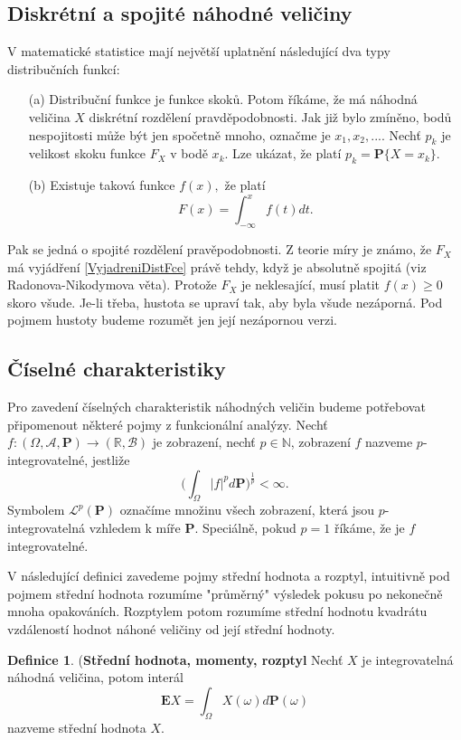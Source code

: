 \documentclass[a4]{report}
\theoremstyle{definition}
\newtheorem{definition}{Definice}[section]
\begin{document}
{\subsection{Diskrétní a spojité náhodné veličiny}
V matematické statistice mají největší uplatnění následující dva typy distribučních funkcí:
\begin{itemize}
\item[(a)] Distribuční funkce je funkce skoků. Potom říkáme, že má náhodná veličina $X$ diskrétní rozdělení pravděpodobnosti. Jak již bylo zmíněno, bodů nespojitosti může být jen spočetně mnoho, označme je $x_{1}, x_{2}, ...$. Nechť $p_{k}$ je velikost skoku funkce $F_{X}$ v bodě $x_{k}$. Lze ukázat, že platí $p_{k} = \textbf{P}\lbrace X = x_{k} \rbrace$.
\item[(b)] Existuje taková funkce $f(x), $ že platí
\begin{equation}\label{VyjadreniDistFce}
F(x) = \int_{-\infty}^{x}f(t)dt.
\end{equation}
\end{itemize}
Pak se jedná o spojité rozdělení pravěpodobnosti. Z teorie míry je známo, že $F_{X}$ má vyjádření \eqref{VyjadreniDistFce} právě tehdy, když je absolutně spojitá (viz Radonova-Nikodymova věta). Protože $F_{X}$ je neklesající, musí platit $f(x) \geq 0$ skoro všude. Je-li třeba, hustota se upraví tak, aby byla všude nezáporná. Pod pojmem hustoty budeme rozumět jen její nezápornou verzi.
\subsection{Číselné charakteristiky}
Pro zavedení číselných charakteristik náhodných veličin budeme potřebovat připomenout některé pojmy z funkcionální analýzy. Nechť $f : (\Omega, \mathcal{A}, \textbf{P}) \longrightarrow (\mathbb{R}, \mathcal{B})$ je zobrazení, nechť $p \in \mathbb{N}$, zobrazení $f$ nazveme $p$-integrovatelné, jestliže
\begin{equation}
\bigg(\int_{\Omega}|f|^{p} d\textbf{P}\bigg)^{\frac{1}{p}} < \infty.
\end{equation}
Symbolem $\mathcal{L}^{p}(\textbf{P})$ označíme množinu všech zobrazení, která jsou $p$-integrovatelná vzhledem k míře $\textbf{P}$. Speciálně, pokud $p = 1$ říkáme, že je $f$ integrovatelné.

V následující definici zavedeme pojmy střední hodnota a rozptyl, intuitivně pod pojmem střední hodnota rozumíme "průměrný" výsledek pokusu po nekonečně mnoha opakováních. Rozptylem potom rozumíme střední hodnotu kvadrátu vzdáleností hodnot náhoné veličiny od její střední hodnoty.
\begin{definition}{(\textbf{Střední hodnota, momenty, rozptyl}}
Nechť $X$ je integrovatelná náhodná veličina, potom interál
\begin{equation}
\textbf{E}X = \int_{\Omega}X(\omega) d\textbf{P}(\omega)
\end{equation} 
nazveme střední hodnota $X$.


\end{definition}}
\end{document}
